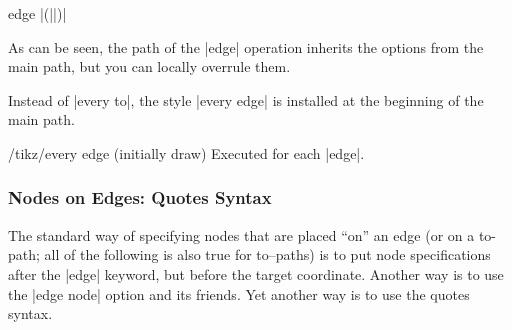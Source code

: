 \begin{pathoperation}{edge}{
     |(||)|}
\begin{codeexample}[]
\end{codeexample}

  As can be seen, the path of the |edge| operation inherits the
  options from the main path, but you can locally overrule them.

\begin{codeexample}[]
\end{codeexample}

  Instead of |every to|, the style |every edge| is installed at the
  beginning of the main path.
  \begin{stylekey}{/tikz/every edge (initially draw)}                 
    Executed for each |edge|.
\begin{codeexample}[]
\end{codeexample}
  \end{stylekey}
\end{pathoperation}


\subsubsection{Nodes on Edges: Quotes Syntax}
\label{section-edge-quotes}

The standard way of specifying nodes that are placed ``on'' an edge
(or on a to-path; all of the following is also true for to--paths) is 
to put node specifications after the |edge| keyword, but before the
target coordinate. Another way is to use the |edge node| option and
its friends. Yet another way is to use the quotes syntax.

